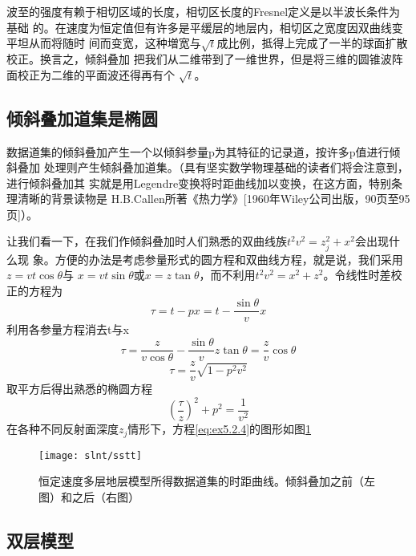 波至的强度有赖于相切区域的长度，相切区长度的Fresnel定义是以半波长条件为基础
的。在速度为恒定值但有许多是平缓层的地层内，相切区之宽度因双曲线变平坦从而将随时
间而变宽，这种増宽与$\sqrt{t}$成比例，抵得上完成了一半的球面扩散校正。换言之，倾斜叠加
把我们从二维带到了一维世界，但是将三维的圆锥波阵面校正为二维的平面波还得再有个
$\sqrt{t}$。

\subsection{倾斜叠加道集是椭圆}
\label{sec:5.2.2}

数据道集的倾斜叠加产生一个以倾斜参量p为其特征的记录道，按许多p值进行倾斜叠加
处理则产生倾斜叠加道集。（具有坚实数学物理基础的读者们将会注意到，进行倾斜叠加其
实就是用Legendre变换将时距曲线加以变换，在这方面，特别条理清晰的背景读物是
H.B.Callen所著《热力学》[1960年Wiley公司出版，90页至95页]）。

让我们看一下，在我们作倾斜叠加时人们熟悉的双曲线族$t^2v^2=z_j^2+x^2$会出现什么现
象。方便的办法是考虑参量形式的圆方程和双曲线方程，就是说，我们采用$z=vt\cos\theta$与 
$x=vt\sin\theta$或$x=z\tan\theta$，而不利用$t^2v^2=x^2+z^2$。令线性时差校正的方程为
\begin{equation}
\tau=t-px=t-\frac{\sin\theta}{v}x
\label{eq:ex5.2.1}
\end{equation}
利用各参量方程消去t与x
\begin{equation}
\tau=\frac{z}{v\cos\theta}-\frac{\sin\theta}{v}z\tan\theta=\frac{z}{v}\cos\theta
\label{eq:ex5.2.2}
\end{equation}
\begin{equation}
\tau=\frac{z}{v}\sqrt{1-p^2v^2}
\label{eq:ex5.2.3}
\end{equation}
取平方后得出熟悉的椭圆方程
\begin{equation}
(\frac{\tau}{z})^2+p^2=\frac{1}{v^2}
\label{eq:ex5.2.4}
\end{equation}
在各种不同反射面深度$z_j$情形下，方程\ref{eq:ex5.2.4}的图形如图\ref{fig:slnt/sstt}

\begin{figure}[H]
\centering
\texttt{[image: slnt/sstt]}
\caption[sstt]{恒定速度多层地层模型所得数据道集的时距曲线。倾斜叠加之前（左图）和之后（右图）}
\label{fig:slnt/sstt}
\end{figure}

\subsection{双层模型}
\label{sec:5.2.3}

